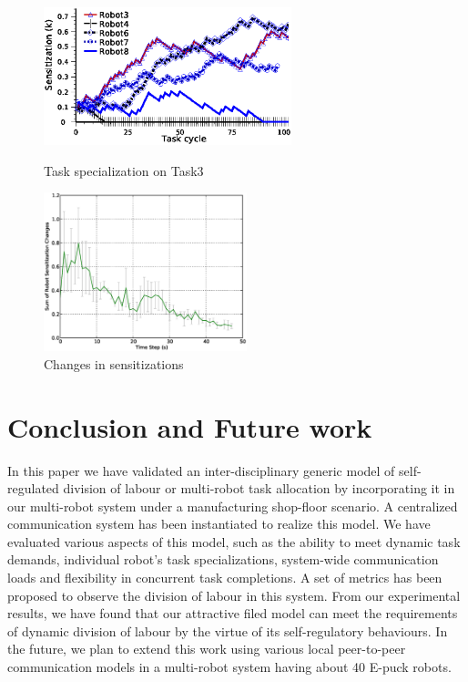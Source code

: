 \documentclass{llncs}
\begin{document}
\begin{figure}
\begin{minipage}[t]{0.48\linewidth}
\centering
\includegraphics[height=4cm, angle=0]{images/TaskSpecialization-task3-10may-1.eps}
\caption{\small Task specialization on Task3}
\label{fig:single-robot-sensitizations} %
\end{minipage} 
\hspace{0.5cm}
\begin{minipage}[t]{0.48\linewidth}
\centering
\includegraphics[height=4.6cm, angle=0]
{images/RobotSensitizationStat-Total-50steps.eps}
\caption{\small Changes in sensitizations}
\label{fig:sensitization-stat} %
\end{minipage}
\end{figure}
\section{Conclusion and Future work}
\label{sec:conc}
In this paper we have validated an inter-disciplinary generic model of self-regulated division of labour or multi-robot task allocation by incorporating it in our multi-robot system under a manufacturing shop-floor scenario. A centralized communication system has been instantiated to realize this model. We have evaluated various aspects of this model, such as the ability to meet dynamic task demands, individual robot's task specializations, system-wide communication loads and flexibility in concurrent task completions. A set of metrics has been proposed to observe the division of labour in this system. From our experimental results, we have found that our attractive filed model can meet the requirements of dynamic division of labour by the virtue of its self-regulatory behaviours. %
In the future, we plan to extend this work using various local peer-to-peer communication models in a multi-robot system having about 40 E-puck robots.
\bigskip
\end{document}
